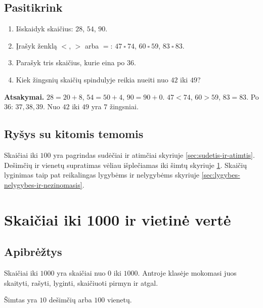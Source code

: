 \subsection{Pasitikrink}

\begin{enumerate}
\item Išskaidyk skaičius: \(28\), \(54\), \(90\).
\item Įrašyk ženklą \(<\), \(>\) arba \(=\): \(47\ \square\ 74\), \(60\ \square\ 59\), \(83\ \square\ 83\).
\item Parašyk tris skaičius, kurie eina po \(36\).
\item Kiek žingsnių skaičių spindulyje reikia nueiti nuo \(42\) iki \(49\)?
\end{enumerate}

\textbf{Atsakymai.} \(28=20+8\), \(54=50+4\), \(90=90+0\). \(47<74\), \(60>59\), \(83=83\). Po \(36\): \(37,38,39\). Nuo \(42\) iki \(49\) yra \(7\) žingsniai.

\subsection{Ryšys su kitomis temomis}

Skaičiai iki \(100\) yra pagrindas sudėčiai ir atimčiai skyriuje \ref{sec:sudetis-ir-atimtis}. Dešimčių ir vienetų supratimas vėliau išplečiamas iki šimtų skyriuje \ref{sec:skaiciai-iki-1000-ir-vietine-verte}. Skaičių lyginimas taip pat reikalingas lygybėms ir nelygybėms skyriuje \ref{sec:lygybes-nelygybes-ir-nezinomasis}.

\section{Skaičiai iki 1000 ir vietinė vertė}\label{sec:skaiciai-iki-1000-ir-vietine-verte}

\subsection{Apibrėžtys}

\begin{apibreztis}
Skaičiai iki \(1000\) yra skaičiai nuo \(0\) iki \(1000\). Antroje klasėje mokomasi juos skaityti, rašyti, lyginti, skaičiuoti pirmyn ir atgal.
\end{apibreztis}

\begin{apibreztis}
Šimtas yra \(10\) dešimčių arba \(100\) vienetų.
\end{apibreztis}

